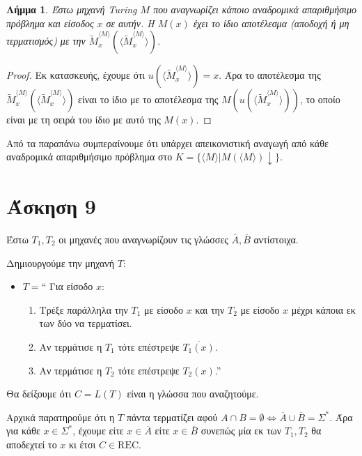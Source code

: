\documentclass[a4paper, oneside, 11pt]{article}
\newtheorem{lm}[thm]{Λήμμα}
\theoremstyle{definition}
\begin{document}
\begin{lm}
Έστω μηχανή Turing $M$ που αναγνωρίζει κάποιο αναδρομικά απαριθμήσιμο πρόβλημα και είσοδος $x$ σε αυτήν. 
Η $M(x)$ έχει το ίδιο αποτέλεσμα (αποδοχή ή μη τερματισμός) με την
$\widetilde{M}_x^{\langle M\rangle}(\langle\widetilde{M}_x^{\langle M\rangle}\rangle)$.
\end{lm}
\begin{proof}
Εκ κατασκευής, έχουμε ότι $u(\langle\widetilde{M}_x^{\langle M\rangle}\rangle)=x$. Άρα το αποτέλεσμα
της $\widetilde{M}_x^{\langle M\rangle}(\langle\widetilde{M}_x^{\langle M\rangle}\rangle)$ είναι το ίδιο με το
αποτέλεσμα της $M(u(\langle\widetilde{M}_x^{\langle M\rangle}\rangle))$, το οποίο 
είναι με τη σειρά του ίδιο με αυτό της $M(x)$.
\end{proof}

Από τα παραπάνω συμπεραίνουμε ότι υπάρχει απεικονιστική αναγωγή από κάθε αναδρομικά απαριθμήσιμο πρόβλημα
στο $K=\{\langle M\rangle | M(\langle M\rangle)\downarrow\}$.

\section*{Άσκηση 9}

Έστω $T_1, T_2$ οι μηχανές που αναγνωρίζουν τις γλώσσες $\overline{A}, \overline{B}$
αντίστοιχα.

Δημιουργούμε την μηχανή $T$:

\begin{itemize}
\item $T = $`` Για είσοδο $x$:
      \begin{enumerate}
         \item Τρέξε παράλληλα την $T_1$ με είσοδο $x$ και την $T_2$ με είσοδο $x$
               μέχρι κάποια εκ των δύο να τερματίσει.
         \item Αν τερμάτισε η $T_1$ τότε επέστρεψε $\overline{T_1(x)}$.
         \item Αν τερμάτισε η $T_2$ τότε επέστρεψε $T_2(x)$.''
      \end{enumerate}
\end{itemize}

Θα δείξουμε ότι $C = L(T)$ είναι η γλώσσα που αναζητούμε.

Αρχικά παρατηρούμε ότι η $T$ πάντα τερματίζει αφού $A \cap B = \emptyset
\Leftrightarrow \overline{A} \cup \overline{B} = \Sigma^*$. Άρα για κάθε $x \in
\Sigma^*$, έχουμε είτε $x \in \overline{A}$ είτε $x \in \overline{B}$ συνεπώς μία εκ
των $T_1, T_2$ θα αποδεχτεί το $x$ κι έτσι $C \in \text{REC}$.
\end{document}
